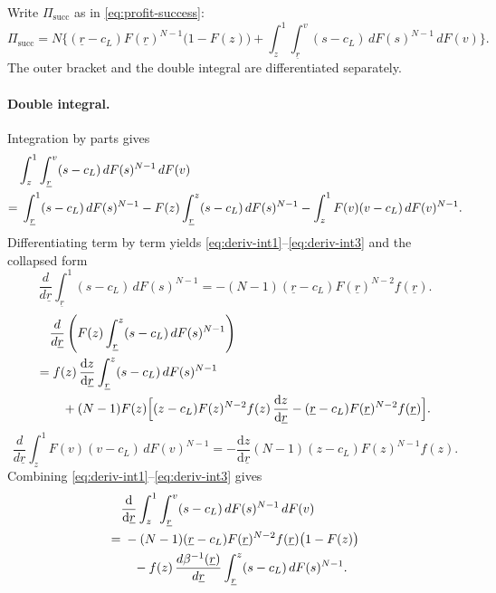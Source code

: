 Write $\Pi_{\text{succ}}$ as in \eqref{eq:profit-success}:
\begin{equation}
  \Pi_{\text{succ}}
  = N \Biggl\{
    (\underline{r} - c_L) F(\underline{r})^{N-1}
      \bigl(1 - F(z)\bigr)
    + \int_{z}^{1}
      \int_{\underline{r}}^{v} (s - c_L)\, dF(s)^{N-1}
      \, dF(v)
  \Biggr\}.
  \label{eq:Pi-succ-appendix}
\end{equation}
The outer bracket and the double integral are differentiated separately.

\paragraph{Double integral.}
Integration by parts gives
\begin{align}
  &\int_{z}^{1}
    \int_{\underline{r}}^{v} (s - c_L)\, dF(s)^{N-1}
    \, dF(v)
  \notag\\
  =&\; \int_{\underline{r}}^{1} (s - c_L)\, dF(s)^{N-1}
    - F(z)
      \int_{\underline{r}}^{z}
        (s - c_L)\, dF(s)^{N-1}
    - \int_{z}^{1}
      F(v)(v - c_L)\, dF(v)^{N-1}.
  \label{eq:double-int-parts}
\end{align}
Differentiating term by term yields \eqref{eq:deriv-int1}--\eqref{eq:deriv-int3}
and the collapsed form
\begin{equation}
  \frac{d}{d\underline{r}}
    \int_{\underline{r}}^{1} (s - c_L)\, dF(s)^{N-1}
  = -(N-1)(\underline{r} - c_L) F(\underline{r})^{N-2} f(\underline{r}).
  \label{eq:deriv-int1}
\end{equation}
\begin{align}
  &\frac{d}{d\underline{r}}
    \left(
      F(z)
      \int_{\underline{r}}^{z}
        (s - c_L)\, dF(s)^{N-1}
    \right)
  \notag\\
  =&\; f(z)\,
    \frac{\mathrm dz}{\mathrm d\underline{r}}
    \int_{\underline{r}}^{z}
      (s - c_L)\, dF(s)^{N-1}
  \notag\\
  &\quad + (N-1) F(z)
    \Bigl[
      (z - c_L) F(z)^{N-2} f(z)\,
        \frac{\mathrm dz}{\mathrm d\underline{r}}
      - (\underline{r} - c_L) F(\underline{r})^{N-2} f(\underline{r})
    \Bigr].
  \label{eq:deriv-int2}
\end{align}
\begin{equation}
  \frac{d}{d\underline{r}}
    \int_{z}^{1}
      F(v)(v - c_L)\, dF(v)^{N-1}
  = -\frac{\mathrm dz}{\mathrm d\underline{r}}
    (N-1)(z - c_L) F(z)^{N-1} f(z).
  \label{eq:deriv-int3}
\end{equation}
Combining \eqref{eq:deriv-int1}--\eqref{eq:deriv-int3} gives
\begin{align}
  &\frac{\mathrm d}{\mathrm d\underline{r}}
    \int_{z}^{1}
    \int_{\underline{r}}^{v} (s - c_L)\, dF(s)^{N-1}
    \, dF(v)
  \notag\\
  =&\; -(N-1)(\underline{r} - c_L) F(\underline{r})^{N-2} f(\underline{r})
    \bigl(1 - F(z)\bigr)
  \notag\\
  &\quad - f(z)\,
    \frac{d\beta^{-1}(\underline{r})}{d\underline{r}}
    \int_{\underline{r}}^{z}
      (s - c_L)\, dF(s)^{N-1}.
  \label{eq:deriv-double-int}
\end{align}

